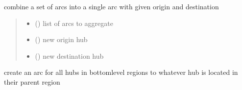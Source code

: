 \documentclass[letterpaper,10pt,english]{sphinxmanual}
\begin{document}
\begin{fulllineitems}
\begin{fulllineitems}
\label{\detokenize{src.models.hydrogen.network.grid:src.models.hydrogen.network.grid.Grid.combine_arcs}}
\pysigstartsignatures
\pysiglinewithargsret
{}
{\sphinxparamcomma {}\sphinxparamcomma {}}
{}
\pysigstopsignatures
\sphinxAtStartPar
combine a set of arcs into a single arc with given origin and destination
\begin{quote}\begin{description}
\begin{itemize}
\item {} 
\sphinxAtStartPar
{} () \textendash{} list of arcs to aggregate

\item {} 
\sphinxAtStartPar
{} () \textendash{} new origin hub

\item {} 
\sphinxAtStartPar
{} () \textendash{} new destination hub

\end{itemize}

\end{description}\end{quote}

\end{fulllineitems}


\begin{fulllineitems}
\label{\detokenize{src.models.hydrogen.network.grid:src.models.hydrogen.network.grid.Grid.connect_subregions}}
\pysigstartsignatures
\pysiglinewithargsret
{}
{}
{}
\pysigstopsignatures
\sphinxAtStartPar
create an arc for all hubs in bottom\sphinxhyphen{}level regions to whatever hub is located in their
parent region

\end{fulllineitems}


\end{fulllineitems}
\end{document}
